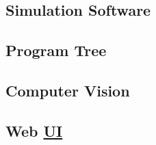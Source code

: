 \subsection{Simulation Software}
\label{subsec:simulation-software}


\subsection{Program Tree}
\label{subsec:program-tree}



\subsection{Computer Vision}
\label{subsec:computer-vision}




\subsection{Web \hyperref[acro:UI]{UI}}
\label{subsec:web-ui}



